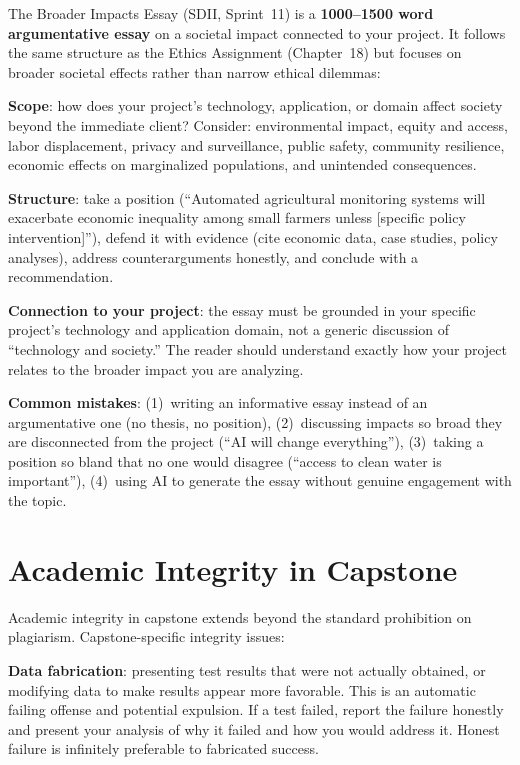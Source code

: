 The Broader Impacts Essay (SDII, Sprint~11) is a \textbf{1000--1500 word argumentative essay} on a societal impact connected to your project. It follows the same structure as the Ethics Assignment (Chapter~18) but focuses on broader societal effects rather than narrow ethical dilemmas:

\textbf{Scope}: how does your project's technology, application, or domain affect society beyond the immediate client? Consider: environmental impact, equity and access, labor displacement, privacy and surveillance, public safety, community resilience, economic effects on marginalized populations, and unintended consequences.

\textbf{Structure}: take a position (``Automated agricultural monitoring systems will exacerbate economic inequality among small farmers unless [specific policy intervention]''), defend it with evidence (cite economic data, case studies, policy analyses), address counterarguments honestly, and conclude with a recommendation.

\textbf{Connection to your project}: the essay must be grounded in your specific project's technology and application domain, not a generic discussion of ``technology and society.'' The reader should understand exactly how your project relates to the broader impact you are analyzing.

\textbf{Common mistakes}: (1)~writing an informative essay instead of an argumentative one (no thesis, no position), (2)~discussing impacts so broad they are disconnected from the project (``AI will change everything''), (3)~taking a position so bland that no one would disagree (``access to clean water is important''), (4)~using AI to generate the essay without genuine engagement with the topic.

\section{Academic Integrity in Capstone}
Academic integrity in capstone extends beyond the standard prohibition on plagiarism. Capstone-specific integrity issues:

\textbf{Data fabrication}: presenting test results that were not actually obtained, or modifying data to make results appear more favorable. This is an automatic failing offense and potential expulsion. If a test failed, report the failure honestly and present your analysis of why it failed and how you would address it. Honest failure is infinitely preferable to fabricated success.

